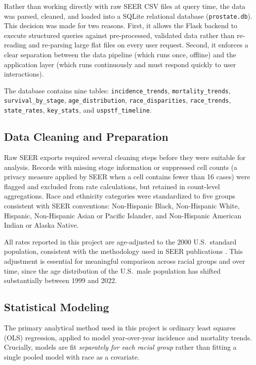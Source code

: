 Rather than working directly with raw SEER CSV files at query time, the data was
parsed, cleaned, and loaded into a SQLite relational database (\texttt{prostate.db}).
This decision was made for two reasons. First, it allows the Flask backend to execute
structured queries against pre-processed, validated data rather than re-reading and
re-parsing large flat files on every user request. Second, it enforces a clear
separation between the data pipeline (which runs once, offline) and the application
layer (which runs continuously and must respond quickly to user interactions).

The database contains nine tables: \texttt{incidence\_trends},
\texttt{mortality\_trends}, \texttt{survival\_by\_stage}, \texttt{age\_distribution},
\texttt{race\_disparities}, \texttt{race\_trends}, \texttt{state\_rates},
\texttt{key\_stats}, and \texttt{uspstf\_timeline}.

\subsection{Data Cleaning and Preparation}

Raw SEER exports required several cleaning steps before they were suitable for
analysis. Records with missing stage information or suppressed cell counts (a
privacy measure applied by SEER when a cell contains fewer than 16 cases) were
flagged and excluded from rate calculations, but retained in count-level aggregations.
Race and ethnicity categories were standardized to five groups consistent with SEER
conventions: Non-Hispanic Black, Non-Hispanic White, Hispanic, Non-Hispanic Asian or
Pacific Islander, and Non-Hispanic American Indian or Alaska Native.

All rates reported in this project are age-adjusted to the 2000 U.S.\ standard
population, consistent with the methodology used in SEER publications \cite{seer2024}.
This adjustment is essential for meaningful comparison across racial groups and over
time, since the age distribution of the U.S.\ male population has shifted
substantially between 1999 and 2022.

\subsection{Statistical Modeling}

The primary analytical method used in this project is ordinary least squares (OLS)
regression, applied to model year-over-year incidence and mortality trends.
Crucially, models are fit \textit{separately for each racial group} rather than
fitting a single pooled model with race as a covariate.

